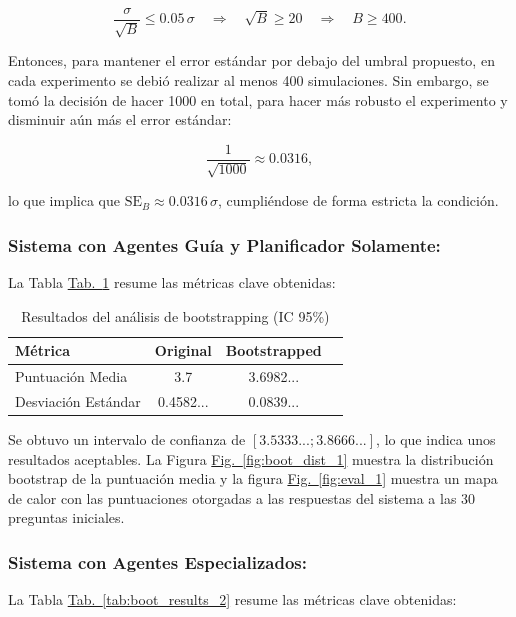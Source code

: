 \documentclass[10pt]{llncs}
\newcommand{\figref}[1]{\hyperref[#1]{Fig.~\ref*{#1}}}
\newcommand{\tabref}[1]{\hyperref[#1]{Tab.~\ref*{#1}}}
\begin{document}
\[
\frac{\sigma}{\sqrt{B}} \leq 0.05\,\sigma \quad \Longrightarrow \quad \sqrt{B} \geq 20 \quad \Longrightarrow \quad B \geq 400.
\]


Entonces, para mantener el error estándar por debajo del umbral propuesto, en cada experimento se debió realizar al menos 400 simulaciones. Sin embargo, se tomó la decisión de 
hacer 1000 en total, para hacer más robusto el experimento y disminuir aún más el error estándar:


\[
\frac{1}{\sqrt{1000}} \approx 0.0316,
\]


lo que implica que $\text{SE}_B\approx 0.0316\,\sigma$, cumpliéndose de forma estricta la condición.


\subsubsection{Sistema con Agentes Guía y Planificador Solamente:}

La Tabla \tabref{tab:boot_results_1} resume las métricas clave obtenidas:

\begin{table}[h]
\centering
\caption{Resultados del análisis de bootstrapping (IC 95\%)}
\label{tab:boot_results_1}
\begin{tabular}{lccc}
\hline
\textbf{Métrica} & \textbf{Original} & \textbf{Bootstrapped}  \\
\hline 
Puntuación Media& 3.7 & 3.6982...  \\
Desviación Estándar & 0.4582... & 0.0839...  \\
\hline
\end{tabular}
\end{table}

\begin{remark}
Se obtuvo un intervalo de confianza de $[3.5333...; 3.8666...]$, lo que indica unos resultados aceptables. 
La Figura {\figref{fig:boot_dist_1}} muestra la distribución bootstrap de la puntuación media y la figura
{\figref{fig:eval_1}} muestra un mapa de calor con las puntuaciones otorgadas a las respuestas del sistema a las 
30 preguntas iniciales.
\end{remark}

\subsubsection{Sistema con Agentes Especializados:}

La Tabla \tabref{tab:boot_results_2} resume las métricas clave obtenidas:
\end{document}
